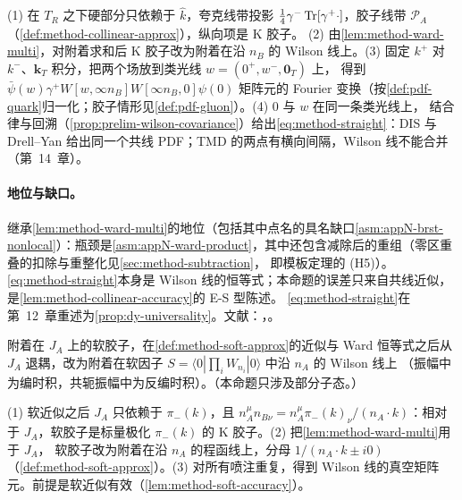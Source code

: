 \begin{proofsketch}
(1) 在 $T_R$ 之下硬部分只依赖于 $\hat k$，夸克线带投影 $\frac14\gamma^-\operatorname{Tr}[\gamma^+\cdot]$，胶子线带 $\mathcal P_A$（\cref{def:method-collinear-approx}），纵向项是 K 胶子。
(2) 由\cref{lem:method-ward-multi}，对附着求和后 K 胶子改为附着在沿 $n_B$ 的 Wilson 线上。(3) 固定 $k^+$ 对 $k^-$、$\mathbf k_T$ 积分，把两个场放到类光线 $w=(0^+,w^-,\mathbf 0_T)$ 上，
得到 $\bar\psi(w)\gamma^+W[w,\infty n_B]W[\infty n_B,0]\psi(0)$ 矩阵元的 Fourier 变换（按\cref{def:pdf-quark}归一化；胶子情形见\cref{def:pdf-gluon}）。(4) $0$ 与 $w$ 在同一条类光线上，
结合律与回溯（\cref{prop:prelim-wilson-covariance}）给出\cref{eq:method-straight}：DIS 与 Drell--Yan 给出同一个共线 PDF；TMD 的两点有横向间隔，Wilson 线不能合并（第~14~章）。
\end{proofsketch}

\paragraph{地位与缺口。}继承\cref{lem:method-ward-multi}的地位（包括其中点名的具名缺口\cref{asm:appN-brst-nonlocal}）：瓶颈是\cref{asm:appN-ward-product}，其中还包含减除后的重组（零区重叠的扣除与重整化见\cref{sec:method-subtraction}，
即模板定理的 (H5)）。\cref{eq:method-straight}本身是 Wilson 线的恒等式；本命题的误差只来自共线近似，是\cref{lem:method-collinear-accuracy}的 E-S 型陈述。
\cref{eq:method-straight}在第~12~章重述为\cref{prop:dy-universality}。文献：\cite{CollinsSoper1982a}，\cite[第~11.9~节]{Collins2011}。

\begin{proposition}\label{prop:method-soft-wilson}
附着在 $J_A$ 上的软胶子，在\cref{def:method-soft-approx}的近似与 Ward 恒等式之后从 $J_A$ 退耦，改为附着在软因子 $S=\langle0|\prod_iW_{n_i}|0\rangle$ 中沿 $n_A$ 的 Wilson 线上
（振幅中为编时积，共轭振幅中为反编时积）。（本命题只涉及部分子态。）
\end{proposition}

\begin{proofsketch}
(1) 软近似之后 $J_A$ 只依赖于 $\pi_-(k)$，且 $n_A^\mu n_{B\nu}=n_A^\mu\pi_-(k)_\nu/(n_A\cdot k)$：相对于 $J_A$，软胶子是标量极化 $\pi_-(k)$ 的 K 胶子。(2) 把\cref{lem:method-ward-multi}用于 $J_A$，
软胶子改为附着在沿 $n_A$ 的程函线上，分母 $1/(n_A\cdot k\pm i0)$（\cref{def:method-soft-approx}）。(3) 对所有喷注重复，得到 Wilson 线的真空矩阵元。前提是软近似有效（\cref{lem:method-soft-accuracy}）。
\end{proofsketch}

